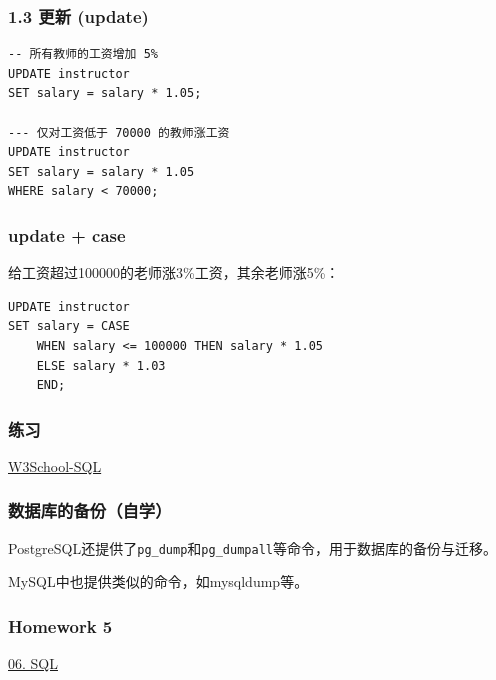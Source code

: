 \documentclass[aspectratio=169, 14pt]{beamer}
\begin{document}
\begin{frame}[fragile]
	\frametitle{1.3 更新 (update)}

	\begin{verbatim}
-- 所有教师的工资增加 5%
UPDATE instructor
SET salary = salary * 1.05;

--- 仅对工资低于 70000 的教师涨工资
UPDATE instructor
SET salary = salary * 1.05
WHERE salary < 70000;
    \end{verbatim}

\end{frame}
\begin{frame}[fragile]
	\frametitle{update + case}

	给工资超过100000的老师涨3\%工资，其余老师涨5\%：

	\begin{verbatim}
UPDATE instructor
SET salary = CASE
    WHEN salary <= 100000 THEN salary * 1.05
    ELSE salary * 1.03
    END;
\end{verbatim}


\end{frame}

\begin{frame}
	\frametitle{练习}
	\href{https://www.w3school.com.cn/quiz/quiz.asp?quiz=sql}{W3School-SQL}
\end{frame}

\begin{frame}
	\frametitle{数据库的备份（自学）}
	PostgreSQL还提供了\texttt{pg\_dump}和\texttt{pg\_dumpall}等命令，用于数据库的备份与迁移。

	MySQL中也提供类似的命令，如{mysqldump}等。


\end{frame}

\begin{frame}
	\frametitle{Homework 5}

	\href{https://github.com/ChenZhongPu/db-swufe/tree/master/06_sql}{06. SQL}

\end{frame}
\end{document}
